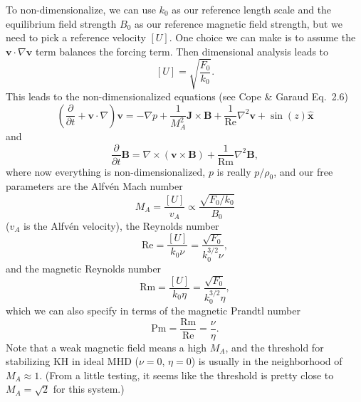 \documentclass[aps,pop,preprint]{revtex4}
\newcommand{\Rm}{\mathrm{Rm}}
\renewcommand{\Re}{\mathrm{Re}}
\newcommand{\Pm}{\mathrm{Pm}}
\begin{document}
	To non-dimensionalize, we can use $k_0$ as our reference length scale and the equilibrium field strength $B_0$ as our reference magnetic field strength, but we need to pick a reference velocity $\left[ U \right]$. 
	One choice we can make is to assume the $\mathbf{v} \cdot \nabla \mathbf{v}$ term balances the forcing term. 
	Then dimensional analysis leads to
	\begin{equation}
	\left[ U \right] = \sqrt{ \frac{F_0}{k_0}}.
	\end{equation}
	This leads to the non-dimensionalized equations (see Cope \& Garaud Eq.~2.6)
	\begin{equation}
	\left( \frac{\partial}{\partial t} + \mathbf{v} \cdot \nabla \right) \mathbf{v} = -\nabla p + \frac{1}{M_A^2} \mathbf{J} \times \mathbf{B} + \frac{1}{\Re} \nabla^2 \mathbf{v} + \sin (z) \hat{\mathbf{x}}
	\end{equation}
	and
	\begin{equation}
	\frac{\partial}{\partial t} \mathbf{B} = \nabla \times (\mathbf{v} \times \mathbf{B}) + \frac{1}{\Rm} \nabla^2 \mathbf{B},
	\end{equation}
	where now everything is non-dimensionalized, $p$ is really $p/\rho_0$, and our free parameters are the Alfv\'{e}n Mach number
	\begin{equation}
	M_A = \frac{\left[ U \right]}{v_A} \propto \frac{\sqrt{F_0/k_0}}{B_0}
	\end{equation}
	($v_A$ is the Alfv\'{e}n velocity), the Reynolds number
	\begin{equation}
	\Re = \frac{\left[ U \right]}{k_0 \nu} = \frac{\sqrt{F_0}}{k_0^{3/2} \nu},
	\end{equation}
	and the magnetic Reynolds number
	\begin{equation}
	\Rm = \frac{\left[ U \right]}{k_0 \eta} = \frac{\sqrt{F_0}}{k_0^{3/2} \eta},
	\end{equation}
	which we can also specify in terms of the magnetic Prandtl number
	\begin{equation}
	\Pm = \frac{\Rm}{\Re} = \frac{\nu}{\eta}.
	\end{equation}
	Note that a weak magnetic field means a high $M_A$, and the threshold for stabilizing KH in ideal MHD ($\nu = 0$, $\eta = 0$) is usually in the neighborhood of $M_A \approx 1$. 
	(From a little testing, it seems like the threshold is pretty close to $M_A = \sqrt{2}$ for this system.) 
	
\end{document}
